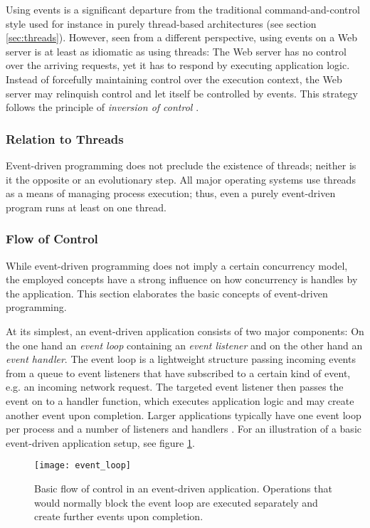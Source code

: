 Using events is a significant departure from the traditional command-and-control style used for instance in purely thread-based architectures (see section \ref{sec:threads}). However, seen from a different perspective, using events on a Web server is at least as idiomatic as using threads: The Web server has no control over the arriving requests, yet it has to respond by executing application logic. Instead of forcefully maintaining control over the execution context, the Web server may relinquish control and let itself be controlled by events. This strategy follows the principle of \textit{inversion of control} \cite{Hohpe2006}. 

\subsubsection*{Relation to Threads}
Event-driven programming does not preclude the existence of threads; neither is it the opposite or an evolutionary step. All major operating systems use threads as a means of managing process execution; thus, even a purely event-driven program runs at least on one thread.

\subsubsection*{Flow of Control}
\label{lab:flow}
While event-driven programming does not imply a certain concurrency model, the employed concepts have a strong influence on how concurrency is handles by the application. This section elaborates the basic concepts of event-driven programming.

At its simplest, an event-driven application consists of two major components: On the one hand an \textit{event loop} containing an \textit{event listener} and on the other hand an \textit{event handler}. The event loop is a lightweight structure passing incoming events from a queue to event listeners that have subscribed to a certain kind of event, e.g. an incoming network request. The targeted event listener then passes the event on to a handler function, which executes application logic and may create another event upon completion. Larger applications typically have one event loop per process and a number of listeners and handlers \cite[p. 33]{Hughes-Croucher2012}. For an illustration of a basic event-driven application setup, see figure \ref{fig:event_loop}.

\begin{figure}
\centering\small
\setlength{\tabcolsep}{0mm}
  \texttt{[image: event\_loop]}
\caption{
Basic flow of control in an event-driven application. Operations that would normally block the event loop are executed separately and create further events upon completion.
}
\label{fig:event_loop}
\end{figure}

